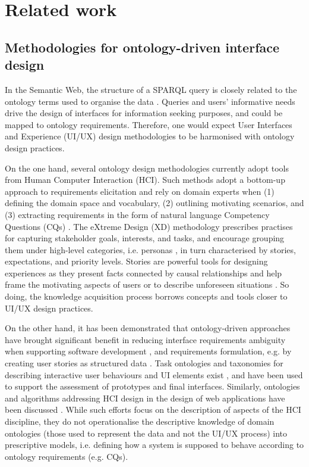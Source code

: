 \documentclass[manuscript]
{acmart}
\begin{document}
\section{Related work} \label{related_works}
\subsection{Methodologies for ontology-driven interface design}
In the Semantic Web, the structure of a SPARQL query is closely related to the ontology terms used to organise the data \cite{charalampidis2018semantic}. Queries and users' informative needs drive the design of interfaces for information seeking purposes, and could be mapped to ontology requirements. Therefore, one would expect User Interfaces and Experience (UI/UX) design methodologies to be harmonised with  ontology design practices.

On the one hand, several ontology design methodologies currently adopt tools from Human Computer Interaction (HCI). Such methods adopt a bottom-up approach to requirements elicitation and rely on domain experts when (1) defining the domain space and vocabulary, (2) outlining motivating scenarios, and (3) extracting requirements in the form of natural language Competency Questions (CQs) \cite{gruninger_methodology_1995, noy_state_1997, suarez-figueroa_neon_2015, cota_applications_2020}. The eXtreme Design (XD) methodology \cite{presutti_extreme_2009, carriero_pattern-based_2021} prescribes practises for capturing stakeholder goals, interests, and tasks, and encourage grouping them under high-level categories, i.e. personas \cite{junior_user_2005}, in turn characterised by stories, expectations, and priority levels. Stories are powerful tools for designing experiences as they present facts connected by causal relationships and help frame the motivating aspects of users or to describe unforeseen situations \cite{gruen_use_2002}. So doing, the knowledge acquisition process borrows concepts and tools closer to UI/UX design practices.

On the other hand, it has been demonstrated that ontology-driven approaches have brought significant benefit in reducing interface requirements ambiguity \cite{dermeval_applications_2016, amna_ambiguity_2022} when supporting software development \cite{dermeval_applications_2016, de_souza_improving_2018, yang_ontology-based_2019}, and requirements formulation, e.g. by creating user stories as structured data \cite{thamrongchote_business_2016}. Task ontologies and taxonomies for describing interactive user behaviours and UI elements exist \cite{ramaprasad_design_2014, paulheim_ui_2013, silva_formal_2017}, and have been used to support the assessment of prototypes and final interfaces. Similarly, ontologies and algorithms addressing HCI design in the design of web applications have been discussed \cite{bakaev_application_2016, bakaev_ontology_2010}. While such efforts focus on the description of aspects of the HCI discipline, they do not operationalise the descriptive knowledge of domain ontologies (those used to represent the data and not the UI/UX process) into prescriptive models, i.e. defining how a system is supposed to behave according to ontology requirements (e.g. CQs).
\end{document}
